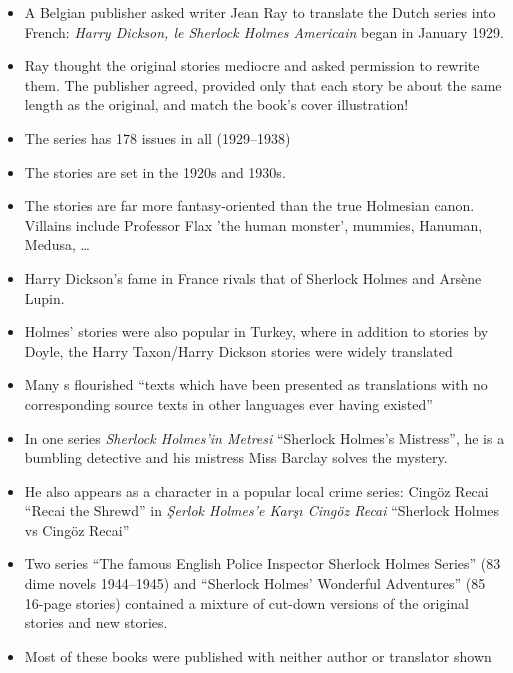\documentclass[a4paper,landscape,headrule,footrule,xetex]{foils}
\begin{document}

\begin{itemize}
\item A Belgian publisher asked writer Jean Ray to translate the Dutch
  series into French: \textit{Harry Dickson, le Sherlock
  Holmes Americain} began in January 1929.
\item Ray thought the original stories mediocre and asked permission
  to rewrite them.  The publisher agreed, provided only that each
  story be about the same length as the original, and match the book's
  cover illustration!
\item The series has 178 issues in all (1929--1938)
\item The stories are set in the 1920s and 1930s.
\item The stories are far more fantasy-oriented than the true
  Holmesian canon.  Villains include Professor Flax 'the human
  monster', mummies, Hanuman, Medusa, \ldots
\item Harry Dickson's fame in France rivals that of Sherlock Holmes and Arsène Lupin.
\end{itemize}



\begin{itemize}\addtolength{\itemsep}{-1ex}
\item Holmes' stories were also popular in Turkey, where in addition
  to stories by Doyle, the Harry Taxon/Harry Dickson stories were
  widely translated
\item Many s flourished ``texts which have
  been presented as translations with no corresponding source texts in
  other languages ever having existed''
\item In one series \textit{Sherlock Holmes'in Metresi} ``Sherlock
  Holmes's Mistress'', he is a bumbling detective and his mistress Miss
  Barclay solves the mystery.
\item He also appears as a character in a popular local crime series: Cingöz Recai ``Recai the Shrewd'' in \textit{Şerlok Holmes'e Karşı Cingöz Recai} ``Sherlock Holmes vs Cingöz Recai''
\item Two series ``The famous English Police Inspector Sherlock Holmes
  Series'' (83 dime novels 1944--1945) and ``Sherlock Holmes'
  Wonderful Adventures'' (85 16-page stories) contained a mixture of
  cut-down versions of the original stories and new stories.
\item Most of these books were published with neither author or
  translator shown
\end{itemize}
\end{document}
